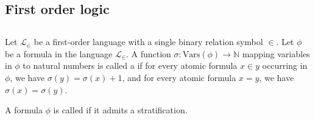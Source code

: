 \subsection{First order logic}

\subsection{}












\begin{definition} \label{definition:stratification_of_variables_in_a_formula_in_a_first_order_language_with_a_binary_relation}
    Let $\mathcal{L}_{\in}$ be a first-order language with a single binary relation symbol $\in$.
    Let $\phi$ be a formula in the language $\mathcal{L}_{\in}$. A function $\sigma: \text{Vars}(\phi) \to \mathbb{N}$ mapping variables in $\phi$ to natural numbers is called a  if for every atomic formula $x \in y$ occurring in $\phi$, we have $\sigma(y) = \sigma(x) + 1$, and for every atomic formula $x = y$, we have $\sigma(x) = \sigma(y)$.

    A formula $\phi$ is called  if it admits a stratification.
\end{definition}






